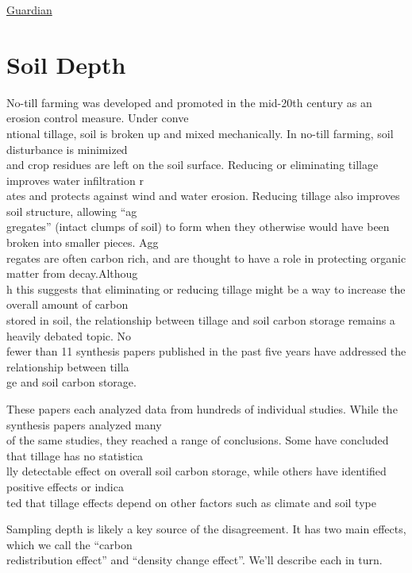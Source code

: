 \documentclass[
]{book}
\begin{document}
\href{https://www.theguardian.com/environment/2021/mar/24/soils-ability-to-absorb-carbon-emissions-may-be-overestimated-study}{Guardian}

\hypertarget{soil-depth}{%
\section{Soil Depth}\label{soil-depth}}

No-till farming was developed and promoted in the mid-20th century as an erosion control measure. Under conve\\
ntional tillage, soil is broken up and mixed mechanically. In no-till farming, soil disturbance is minimized\\
and crop residues are left on the soil surface. Reducing or eliminating tillage improves water infiltration r\\
ates and protects against wind and water erosion. Reducing tillage also improves soil structure, allowing ``ag\\
gregates'' (intact clumps of soil) to form when they otherwise would have been broken into smaller pieces. Agg\\
regates are often carbon rich, and are thought to have a role in protecting organic matter from decay.Althoug\\
h this suggests that eliminating or reducing tillage might be a way to increase the overall amount of carbon\\
stored in soil, the relationship between tillage and soil carbon storage remains a heavily debated topic. No\\
fewer than 11 synthesis papers published in the past five years have addressed the relationship between tilla\\
ge and soil carbon storage.

These papers each analyzed data from hundreds of individual studies. While the synthesis papers analyzed many\\
of the same studies, they reached a range of conclusions. Some have concluded that tillage has no statistica\\
lly detectable effect on overall soil carbon storage, while others have identified positive effects or indica\\
ted that tillage effects depend on other factors such as climate and soil type

Sampling depth is likely a key source of the disagreement. It has two main effects, which we call the ``carbon\\
redistribution effect'' and ``density change effect''. We'll describe each in turn.
\end{document}
